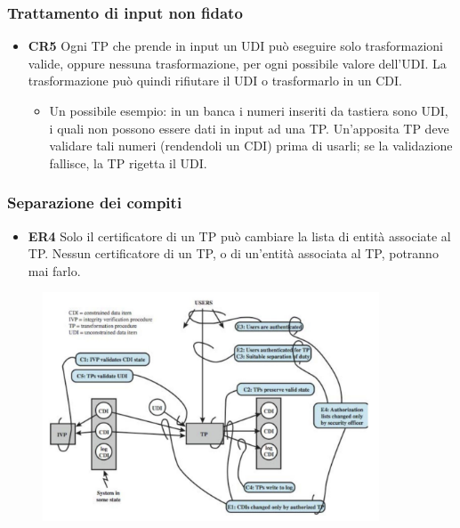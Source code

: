 \subsubsection{Trattamento di input non fidato}

\begin{itemize}
      \item \textbf{CR5} Ogni TP che prende in input un UDI può eseguire solo
            trasformazioni valide, oppure
            nessuna trasformazione, per ogni possibile valore dell'UDI.
            La trasformazione può quindi rifiutare il
            UDI o trasformarlo in un CDI.
            \begin{itemize}
                  \item Un possibile esempio: in un banca i numeri inseriti
                        da tastiera sono UDI, i quali non possono essere dati in input
                        ad una TP. Un'apposita TP deve validare tali numeri
                        (rendendoli un CDI) prima di usarli; se
                        la validazione fallisce, la TP rigetta il UDI.
            \end{itemize}
\end{itemize}

\subsubsection{Separazione dei compiti}

\begin{itemize}
      \item \textbf{ER4} Solo il certificatore di un TP può cambiare la lista di
            entità associate al TP. Nessun
            certificatore di un TP, o di un'entità associata al TP, potranno mai
            farlo.
\end{itemize}

\begin{figure}[H]
      \centering
      \includegraphics[width=10cm, keepaspectratio]{capitoli/policy/imgs/clark_wilson5.png}
\end{figure}

